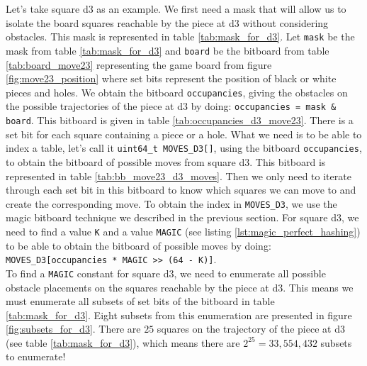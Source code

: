 \documentclass[12pt,a4paper,twoside,openright]{book}
\begin{document}
Let's take square {\ttfamily d3} as an example. We first need a mask that will allow us to isolate the board squares reachable by the piece at {\ttfamily d3} without considering obstacles. This mask is represented in table \ref{tab:mask_for_d3}. Let \texttt{mask} be the mask from table \ref{tab:mask_for_d3} and \texttt{board} be the bitboard from table \ref{tab:board_move23} representing the game board from figure \ref{fig:move23_position} where set bits represent the position of black or white pieces and holes. We obtain the bitboard \texttt{occupancies}, giving the obstacles on the possible trajectories of the piece at {\ttfamily d3} by doing: \texttt{occupancies = mask & board}. This bitboard is given in table \ref{tab:occupancies_d3_move23}. There is a set bit for each square containing a piece or a hole. What we need is to be able to index a table, let's call it \texttt{uint64_t MOVES_D3[]}, using the bitboard \texttt{occupancies}, to obtain the bitboard of possible moves from square {\ttfamily d3}. This bitboard is represented in table \ref{tab:bb_move23_d3_moves}. Then we only need to iterate through each set bit in this bitboard to know which squares we can move to and create the corresponding move. To obtain the index in \texttt{MOVES_D3}, we use the magic bitboard technique we described in the previous section. For square {\ttfamily d3}, we need to find a value \texttt{K} and a value \texttt{MAGIC} (see listing \ref{lst:magic_perfect_hashing}) to be able to obtain the bitboard of possible moves by doing: \texttt{MOVES_D3[occupancies * MAGIC >> (64 - K)]}.\\

To find a \texttt{MAGIC} constant for square {\ttfamily d3}, we need to enumerate all possible obstacle placements on the squares reachable by the piece at {\ttfamily d3}. This means we must enumerate all subsets of set bits of the bitboard in table \ref{tab:mask_for_d3}. Eight subsets from this enumeration are presented in figure \ref{fig:subsets_for_d3}. There are $25$ squares on the trajectory of the piece at {\ttfamily d3} (see table \ref{tab:mask_for_d3}), which means there are $2^{25} = 33,554,432$ subsets to enumerate!
\end{document}
